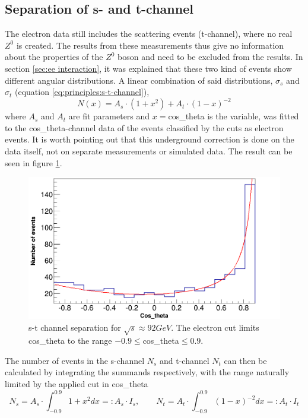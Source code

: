 \subsection{Separation of s- and t-channel}
The electron data still includes the scattering events (t-channel), where no real $Z^0$ is created. The results from these measurements thus give no information about the properties of the $Z^0$ boson and need to be excluded from the results. In section \ref{sec:ee interaction}, it was explained that these two kind of events show different angular distributions. A linear combination of said distributions, $\sigma_s$ and $\sigma_t$ (equation \ref{eq:principles:s-t-channel}),
\begin{equation}
N(x)=A_s\cdot(1+x^2)+A_t\cdot(1-x)^{-2}
\end{equation}
where $A_s$ and $A_t$ are fit parameters and $x=$cos\_theta is the variable, was fitted to the cos\_theta-channel data of the events classified by the cuts as electron events. It is worth pointing out that this underground correction is done on the data itself, not on separate measurements or simulated data. The result can be seen in figure \ref{fig:stchannelseparation}.
\begin{figure}
\centering
\includegraphics[width=1.0\linewidth]{../results/data_results/cosp_fits/stchannelexample46.png}
\caption[s-t-channel separation $\sqrt{s}\approx\unit{92}{GeV}$ GeV]{s-t channel separation for $\sqrt{s}\approx\unit{92}{GeV}$. The electron cut limits cos\_theta to the range $-0.9\le$cos\_theta$\le0.9$.}
\label{fig:stchannelseparation}
\end{figure}
The number of events in the s-channel $N_s$ and t-channel $N_t$ can then be calculated by integrating the summands respectively, with the range naturally limited by the applied cut in cos\_theta
\begin{equation}
N_s=A_s\cdot\int_{-0.9}^{0.9}1+x^2dx=:A_s\cdot I_s,\qquad N_t=A_t\cdot\int_{-0.9}^{0.9}(1-x)^{-2}dx=:A_t\cdot I_t
\end{equation}
